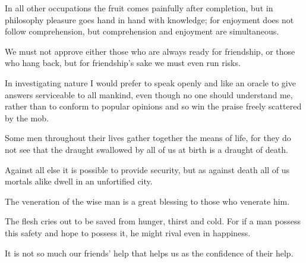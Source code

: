 \documentclass{stex}
\begin{document}
\begin{sparagraph}[title=27]
  In all other occupations the fruit comes painfully after completion, but in philosophy pleasure goes hand in hand with knowledge; for enjoyment does not follow comprehension, but comprehension and enjoyment are simultaneous.
\end{sparagraph}
\vspace{0.5em}
\begin{sparagraph}[title=28]
  We must not approve either those who are always ready for friendship, or those who hang back, but for friendship’s sake we must even run risks.
\end{sparagraph}
\vspace{0.5em}
\begin{sparagraph}[title=29]
  In investigating nature I would prefer to speak openly and like an oracle to give answers serviceable to all mankind, even though no one should understand me, rather than to conform to popular opinions and so win the praise freely scattered by the mob.
\end{sparagraph}
\vspace{0.5em}
\begin{sparagraph}[title=30]
  Some men throughout their lives gather together the means of life, for they do not see that the draught swallowed by all of us at birth is a draught of death.
\end{sparagraph}
\vspace{0.5em}
\begin{sparagraph}[title=31]
  Against all else it is possible to provide security, but as against death all of us mortals alike dwell in an unfortified city.
\end{sparagraph}
\vspace{0.5em}
\begin{sparagraph}[title=32]
  The veneration of the wise man is a great blessing to those who venerate him.
\end{sparagraph}
\vspace{0.5em}
\begin{sparagraph}[title=33]
  The flesh cries out to be saved from hunger, thirst and cold.
  For if a man possess this safety and hope to possess it, he might rival even  in happiness.
\end{sparagraph}
\vspace{0.5em}
\begin{sparagraph}[title=34]
  It is not so much our friends’ help that helps us as the confidence of their help.
\end{sparagraph}
\end{document}
